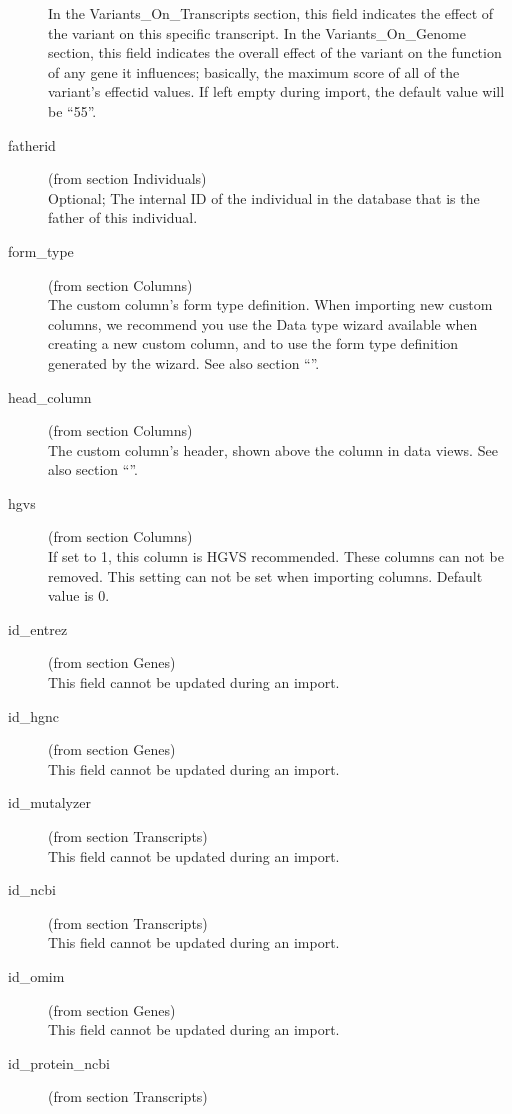 \begin{description}
  In the Variants\_On\_Transcripts section, this field indicates the effect of the variant on this specific transcript.
  In the Variants\_On\_Genome section, this field indicates the overall effect of the variant on the function
   of any gene it influences; basically, the maximum score of all of the variant's effectid values.
  If left empty during import, the default value will be ``55''.

  \item[fatherid] (from section Individuals)\hfill \\
  Optional; The internal ID of the individual in the database that is the father of this individual.
  \item[form\_type] (from section Columns)\hfill \\
  The custom column's form type definition.
  When importing new custom columns, we recommend you use the Data type wizard available
   when creating a new custom column, and to use the form type definition generated by the wizard.
  See also section ``''.
  \item[head\_column] (from section Columns)\hfill \\
  The custom column's header, shown above the column in data views.
  See also section ``''.
  \item[hgvs] (from section Columns)\hfill \\
  If set to 1, this column is HGVS recommended.
  These columns can not be removed.
  This setting can not be set when importing columns.
  Default value is 0.
  \item[id\_entrez] (from section Genes)\hfill \\
  This field cannot be updated during an import.
  \item[id\_hgnc] (from section Genes)\hfill \\
  This field cannot be updated during an import.
  \item[id\_mutalyzer] (from section Transcripts)\hfill \\
  This field cannot be updated during an import.
  \item[id\_ncbi] (from section Transcripts)\hfill \\
  This field cannot be updated during an import.
  \item[id\_omim] (from section Genes)\hfill \\
  This field cannot be updated during an import.
  \item[id\_protein\_ncbi] (from section Transcripts)\hfill \\

\end{description}
